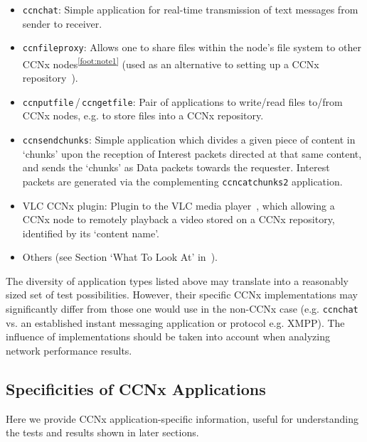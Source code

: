 \begin{itemize}

    \item \verb?ccnchat?: Simple application for real-time transmission of text 
            messages from sender to receiver.
    \item \verb?ccnfileproxy?: Allows one to share files within the 
            node's file system to other CCNx 
            nodes\textsuperscript{\ref{foot:note1}} (used as an alternative to 
            setting up a CCNx repository~\cite{Muther2012a}).
    \item \verb?ccnputfile?\,\slash\,\verb?ccngetfile?: Pair of applications to 
            write\slash read files to\slash from CCNx nodes, e.g. to store 
            files into a CCNx repository.
    \item \verb?ccnsendchunks?: Simple application 
            which divides a given piece of content in `chunks' upon the 
            reception of Interest packets directed at that same content, and 
            sends the `chunks' as Data packets towards the requester. Interest 
            packets are generated via the complementing \verb?ccncatchunks2?
            application.
    \item VLC CCNx plugin: Plugin to the VLC media player~\cite{website:vlc}, 
            which allowing a CCNx node to remotely playback a video stored on a 
            CCNx repository, identified by its `content name'.
    \item Others (see Section `What To Look At' in~\cite{Muther2012a}).

\end{itemize}

The diversity of application types listed above may translate into a reasonably 
sized set of test possibilities. However, their specific CCNx implementations may 
significantly differ from those one would use in the non-CCNx case (e.g. 
\verb?ccnchat? vs. an established instant messaging application 
or protocol e.g. XMPP). The influence of implementations should be taken 
into account when analyzing network performance results.\vertbreak

\subsection{Specificities of CCNx Applications}
\label{subsec:ccnx-specifics}

Here we provide CCNx application-specific information, useful for understanding the 
tests and results shown in later sections.

